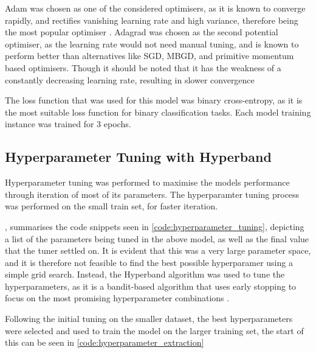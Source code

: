 Adam was chosen as one of the considered optimisers, as it is known to converge rapidly, and rectifies vanishing learning rate and high variance, therefore being the most popular optimiser \cite{RAIAAN2024100470}. Adagrad was chosen as the second potential optimiser, as the learning rate would not need manual tuning, and is known to perform better than alternatives like SGD, MBGD, and primitive momentum based optimisers. Though it should be noted that it has the weakness of a constantly decreasing learning rate, resulting in slower convergence \cite{RAIAAN2024100470}

The loss function that was used for this model was binary cross-entropy, as it is the most suitable loss function for binary classification tasks. Each model training instance was trained for 3 epochs. 

\newpage

\subsection{Hyperparameter Tuning with Hyperband}

Hyperparameter tuning was performed to maximise the models performance through iteration of most of its parameters. The hyperparamter tuning process was performed on the small train set, for faster iteration.

, summarises the code snippets seen in \cref{code:hyperparameter_tuning}, depicting a list of the parameters being tuned in the above model, as well as the final value that the tuner settled on. It is evident that this was a very large parameter space, and it is therefore not feasible to find the best possible hyperparamer using a simple grid search. Instead, the Hyperband algorithm was used to tune the hyperparameters, as it is a bandit-based algorithm that uses early stopping to focus on the most promising hyperparameter combinations \cite{hyperband}.

Following the initial tuning on the smaller dataset, the best hyperparameters were selected and used to train the model on the larger training set, the start of this can be seen in \cref{code:hyperparameter_extraction}

